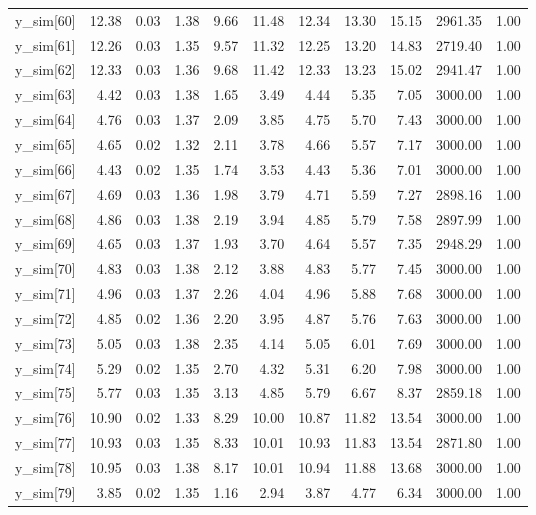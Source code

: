 \begin{table}[ht]
\begin{tabular}{rrrrrrrrrrr}
  y\_sim[60] & 12.38 & 0.03 & 1.38 & 9.66 & 11.48 & 12.34 & 13.30 & 15.15 & 2961.35 & 1.00 \\ 
  y\_sim[61] & 12.26 & 0.03 & 1.35 & 9.57 & 11.32 & 12.25 & 13.20 & 14.83 & 2719.40 & 1.00 \\ 
  y\_sim[62] & 12.33 & 0.03 & 1.36 & 9.68 & 11.42 & 12.33 & 13.23 & 15.02 & 2941.47 & 1.00 \\ 
  y\_sim[63] & 4.42 & 0.03 & 1.38 & 1.65 & 3.49 & 4.44 & 5.35 & 7.05 & 3000.00 & 1.00 \\ 
  y\_sim[64] & 4.76 & 0.03 & 1.37 & 2.09 & 3.85 & 4.75 & 5.70 & 7.43 & 3000.00 & 1.00 \\ 
  y\_sim[65] & 4.65 & 0.02 & 1.32 & 2.11 & 3.78 & 4.66 & 5.57 & 7.17 & 3000.00 & 1.00 \\ 
  y\_sim[66] & 4.43 & 0.02 & 1.35 & 1.74 & 3.53 & 4.43 & 5.36 & 7.01 & 3000.00 & 1.00 \\ 
  y\_sim[67] & 4.69 & 0.03 & 1.36 & 1.98 & 3.79 & 4.71 & 5.59 & 7.27 & 2898.16 & 1.00 \\ 
  y\_sim[68] & 4.86 & 0.03 & 1.38 & 2.19 & 3.94 & 4.85 & 5.79 & 7.58 & 2897.99 & 1.00 \\ 
  y\_sim[69] & 4.65 & 0.03 & 1.37 & 1.93 & 3.70 & 4.64 & 5.57 & 7.35 & 2948.29 & 1.00 \\ 
  y\_sim[70] & 4.83 & 0.03 & 1.38 & 2.12 & 3.88 & 4.83 & 5.77 & 7.45 & 3000.00 & 1.00 \\ 
  y\_sim[71] & 4.96 & 0.03 & 1.37 & 2.26 & 4.04 & 4.96 & 5.88 & 7.68 & 3000.00 & 1.00 \\ 
  y\_sim[72] & 4.85 & 0.02 & 1.36 & 2.20 & 3.95 & 4.87 & 5.76 & 7.63 & 3000.00 & 1.00 \\ 
  y\_sim[73] & 5.05 & 0.03 & 1.38 & 2.35 & 4.14 & 5.05 & 6.01 & 7.69 & 3000.00 & 1.00 \\ 
  y\_sim[74] & 5.29 & 0.02 & 1.35 & 2.70 & 4.32 & 5.31 & 6.20 & 7.98 & 3000.00 & 1.00 \\ 
  y\_sim[75] & 5.77 & 0.03 & 1.35 & 3.13 & 4.85 & 5.79 & 6.67 & 8.37 & 2859.18 & 1.00 \\ 
  y\_sim[76] & 10.90 & 0.02 & 1.33 & 8.29 & 10.00 & 10.87 & 11.82 & 13.54 & 3000.00 & 1.00 \\ 
  y\_sim[77] & 10.93 & 0.03 & 1.35 & 8.33 & 10.01 & 10.93 & 11.83 & 13.54 & 2871.80 & 1.00 \\ 
  y\_sim[78] & 10.95 & 0.03 & 1.38 & 8.17 & 10.01 & 10.94 & 11.88 & 13.68 & 3000.00 & 1.00 \\ 
  y\_sim[79] & 3.85 & 0.02 & 1.35 & 1.16 & 2.94 & 3.87 & 4.77 & 6.34 & 3000.00 & 1.00 \\ 

\end{tabular}
\end{table}
